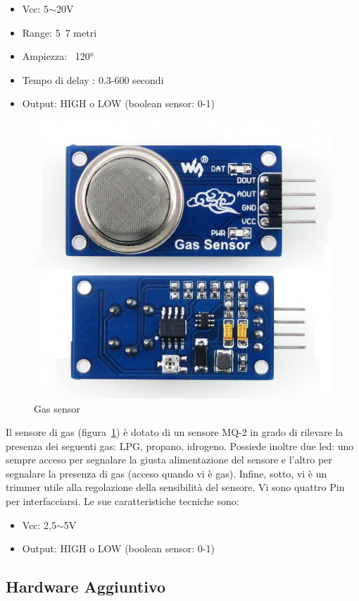 \begin{itemize}
	\item Vcc: 5$\sim$20V
	\item Range: 5~7 metri
	\item Ampiezza: ~120°
	\item Tempo di delay : 0.3-600 secondi
	\item Output: HIGH o LOW (boolean sensor: 0-1)
\end{itemize}


\begin{figure}
	\centering
	\includegraphics[width=0.7\linewidth]{Figures/Sensors&Rasp/mq-2}
	\caption[gas]{Gas sensor}
	\label{fig:mq2}

\end{figure}

Il sensore di gas (figura~\ref{fig:mq2}) è dotato di un sensore MQ-2 in grado di rilevare la presenza dei seguenti gas:  LPG, propano, idrogeno. Possiede inoltre due led: uno sempre acceso per segnalare la giusta alimentazione del sensore e l'altro per segnalare la presenza di gas (acceso quando vi è gas). Infine, sotto, vi è un trimmer utile alla regolazione della sensibilità del sensore. Vi sono quattro Pin per interfacciarsi.
Le sue caratteristiche tecniche sono: 

\begin{itemize}
	\item Vcc: 2,5$\sim$5V
	\item Output: HIGH o LOW (boolean sensor: 0-1)
\end{itemize}

\newpage

\subsection{Hardware Aggiuntivo}

